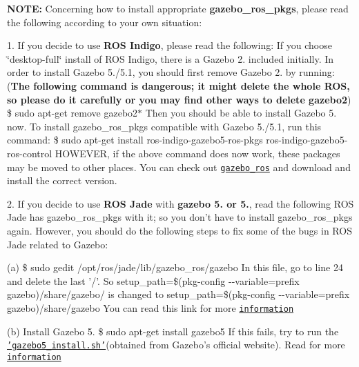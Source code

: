 {\bfseries N\-O\-T\-E\-:} Concerning how to install appropriate {\bfseries gazebo\-\_\-ros\-\_\-pkgs}, please read the following according to your own situation\-:
\begin{DoxyItemize}
\item 1. If you decide to use {\bfseries R\-O\-S Indigo}, please read the following\-: If you choose \char`\"{}desktop-\/full\char`\"{} install of R\-O\-S Indigo, there is a Gazebo 2. included initially. In order to install Gazebo 5./5.1, you should first remove Gazebo 2. by running\-: ({\bfseries The following command is dangerous; it might delete the whole R\-O\-S, so please do it carefully or you may find other ways to delete gazebo2}) {\ttfamily \$ sudo apt-\/get remove gazebo2$\ast$} Then you should be able to install Gazebo 5. now. To install gazebo\-\_\-ros\-\_\-pkgs compatible with Gazebo 5./5.1, run this command\-: {\ttfamily \$ sudo apt-\/get install ros-\/indigo-\/gazebo5-\/ros-\/pkgs ros-\/indigo-\/gazebo5-\/ros-\/control} H\-O\-W\-E\-V\-E\-R, if the above command does now work, these packages may be moved to other places. You can check out \href{https://github.com/ros-simulation/gazebo_ros_pkgs.git}{\tt gazebo\-\_\-ros} and download and install the correct version.
\item 2. If you decide to use {\bfseries R\-O\-S Jade} with {\bfseries gazebo 5. or 5.}, read the following R\-O\-S Jade has gazebo\-\_\-ros\-\_\-pkgs with it; so you don't have to install gazebo\-\_\-ros\-\_\-pkgs again. However, you should do the following steps to fix some of the bugs in R\-O\-S Jade related to Gazebo\-:
\begin{DoxyItemize}
\item (a) {\ttfamily \$ sudo gedit /opt/ros/jade/lib/gazebo\-\_\-ros/gazebo} In this file, go to line 24 and delete the last '/'. So {\ttfamily setup\-\_\-path=\$(pkg-\/config -\/-\/variable=prefix gazebo)/share/gazebo/} is changed to {\ttfamily setup\-\_\-path=\$(pkg-\/config -\/-\/variable=prefix gazebo)/share/gazebo} You can read this link for more \href{http://answers.ros.org/question/215796/problem-for-install-gazebo_ros_package/}{\tt information}
\item (b) Install Gazebo 5. {\ttfamily \$ sudo apt-\/get install gazebo5} If this fails, try to run the \href{https://github.com/nubot-nudt/simatch/blob/master/gazebo5_install.sh}{\tt 'gazebo5\-\_\-install.\-sh'}(obtained from Gazebo's official website). Read for more \href{http://answers.ros.org/question/217970/ros-jade-and-gazebo-50-migration-problem/}{\tt information}

\end{DoxyItemize}
\end{DoxyItemize}
